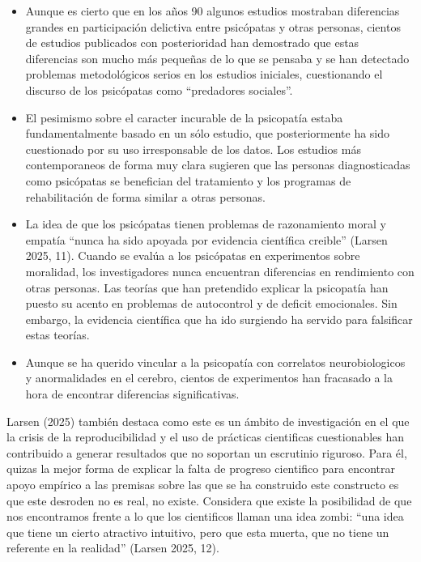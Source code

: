 \documentclass[
  spanish,
  letterpaper,
  DIV=11,
  numbers=noendperiod]{scrreprt}
\begin{document}
\begin{itemize}
\item
  Aunque es cierto que en los años 90 algunos estudios mostraban
  diferencias grandes en participación delictiva entre psicópatas y
  otras personas, cientos de estudios publicados con posterioridad han
  demostrado que estas diferencias son mucho más pequeñas de lo que se
  pensaba y se han detectado problemas metodológicos serios en los
  estudios iniciales, cuestionando el discurso de los psicópatas como
  ``predadores sociales''.
\item
  El pesimismo sobre el caracter incurable de la psicopatía estaba
  fundamentalmente basado en un sólo estudio, que posteriormente ha sido
  cuestionado por su uso irresponsable de los datos. Los estudios más
  contemporaneos de forma muy clara sugieren que las personas
  diagnosticadas como psicópatas se benefician del tratamiento y los
  programas de rehabilitación de forma similar a otras personas.
\item
  La idea de que los psicópatas tienen problemas de razonamiento moral y
  empatía ``nunca ha sido apoyada por evidencia científica creible''
  (Larsen 2025, 11). Cuando se evalúa a los psicópatas en experimentos
  sobre moralidad, los investigadores nunca encuentran diferencias en
  rendimiento con otras personas. Las teorías que han pretendido
  explicar la psicopatía han puesto su acento en problemas de
  autocontrol y de deficit emocionales. Sin embargo, la evidencia
  científica que ha ido surgiendo ha servido para falsificar estas
  teorías.
\item
  Aunque se ha querido vincular a la psicopatía con correlatos
  neurobiologicos y anormalidades en el cerebro, cientos de experimentos
  han fracasado a la hora de encontrar diferencias significativas.
\end{itemize}

Larsen (2025) también destaca como este es un ámbito de investigación en
el que la crisis de la reproducibilidad y el uso de prácticas
cientificas cuestionables han contribuido a generar resultados que no
soportan un escrutinio riguroso. Para él, quizas la mejor forma de
explicar la falta de progreso cientifico para encontrar apoyo empírico a
las premisas sobre las que se ha construido este constructo es que este
desroden no es real, no existe. Considera que existe la posibilidad de
que nos encontramos frente a lo que los cientificos llaman una idea
zombi: ``una idea que tiene un cierto atractivo intuitivo, pero que esta
muerta, que no tiene un referente en la realidad'' (Larsen 2025, 12).
\end{document}

